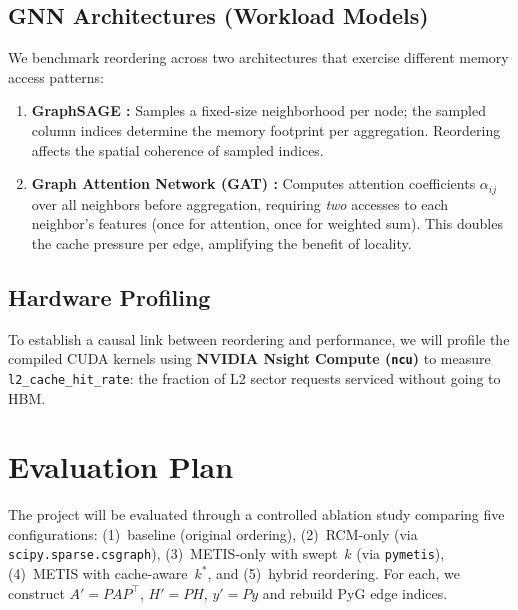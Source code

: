 \documentclass[sigconf,review]{acmart}
\begin{document}
\subsection{GNN Architectures (Workload Models)}
We benchmark reordering across two architectures that exercise different memory access patterns:
\begin{enumerate}
    \item \textbf{GraphSAGE \cite{hamilton2017sage}:} Samples a fixed-size neighborhood per node; the sampled column indices determine the memory footprint per aggregation. Reordering affects the spatial coherence of sampled indices.
    \item \textbf{Graph Attention Network (GAT) \cite{velickovic2018gat}:} Computes attention coefficients $\alpha_{ij}$ over all neighbors before aggregation, requiring \emph{two} accesses to each neighbor's features (once for attention, once for weighted sum). This doubles the cache pressure per edge, amplifying the benefit of locality.
\end{enumerate}


\subsection{Hardware Profiling}
To establish a causal link between reordering and performance, we will profile the compiled CUDA kernels using \textbf{NVIDIA Nsight Compute (\texttt{ncu})} to measure \texttt{l2\_cache\_hit\_rate}: the fraction of L2 sector requests serviced without going to HBM.

\section{Evaluation Plan}

The project will be evaluated through a controlled ablation study comparing five configurations: (1)~baseline (original ordering), (2)~RCM-only (via \texttt{scipy.sparse.csgraph}), (3)~METIS-only with swept~$k$ (via \texttt{pymetis}), (4)~METIS with cache-aware~$k^*$, and (5)~hybrid reordering. For each, we construct $A' = PAP^\top$, $H'=PH$, $y'=Py$ and rebuild PyG edge indices.
\end{document}
